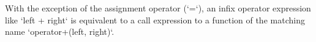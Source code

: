 \begin{Syntax}
\end{Syntax}


%

\begin{Checking}

\end{Checking}

With the exception of the assignment operator (`=`), an infix operator expression like `left + right` is equivalent to a call expression to a function of the matching name `operator+(left, right)`.

